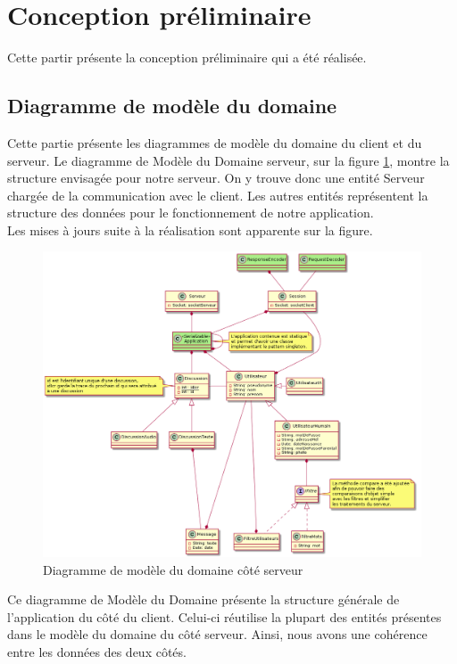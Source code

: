 \section{Conception préliminaire}

Cette partir présente la conception préliminaire qui a été réalisée.

	\subsection{Diagramme de modèle du domaine}
	Cette partie présente les diagrammes de modèle du domaine du client et du serveur.
	Le diagramme de Modèle du Domaine serveur, sur la figure \ref{diagModeleServeur}, montre la structure envisagée pour notre serveur.
	On y trouve donc une entité Serveur chargée de la communication avec le client.
	Les autres entités représentent la structure des données pour le fonctionnement de notre application.\\
	
	Les mises à jours suite à la réalisation sont apparente sur la figure.

	\begin{figure}[H]
		\centerline{\includegraphics[width=16.5cm]{img/modeleDomaineServeurV2.png}}
		
		\caption{\label{diagModeleServeur}Diagramme de modèle du domaine côté serveur}
	\end{figure}

	\newpage

	Ce diagramme de Modèle du Domaine présente la structure générale de l'application du côté du client.
	Celui-ci réutilise la plupart des entités présentes dans le modèle du domaine du côté serveur.
	Ainsi, nous avons une cohérence entre les données des deux côtés. \\
	
